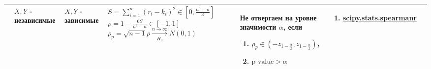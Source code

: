 \documentclass[14pt, a1paper, fleqn]{extarticle}
\begin{document}
\begin{center}
\begin{tabular}{|p{6cm}|p{8cm}|p{3cm}|p{3cm}|p{9cm}|p{10cm}|p{14cm}|}
            & \( X, Y \) - независимые
            & \( X, Y \) - зависимые 
            & \( S = \sum_{i=1}^{n} (r_i - k_i)^2 \in \left[ 0, \frac{n^3 - n}{3} \right]\)
            \newline
            \( \rho = 1 - \frac{6S}{n^3-n} \in [-1, 1] \)
            \newline
            \( \rho_p = \sqrt{n-1} \rho \xrightarrow[H_0]{n \to \infty} N(0, 1) \)
            & Не отвергаем на уровне значимости \( \alpha \), если 
            \begin{enumerate}
                \item \( \rho_p \in \left( -z_{1-\frac{\alpha}{2}}, z_{1-\frac{\alpha}{2}} \right) \),
                \item \( \text{p-value} > \alpha \)
            \end{enumerate} 
            & \begin{enumerate}
                \item \href{https://docs.scipy.org/doc/scipy/reference/generated/scipy.stats.spearmanr.html}{scipy.stats.spearmanr}
            \end{enumerate} \\
            \hline
        \end{tabular}
    \end{center}
\end{document}

